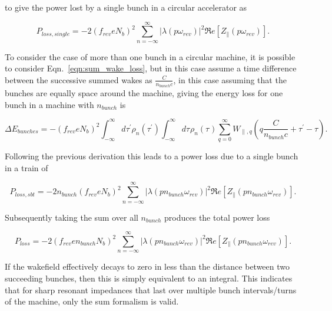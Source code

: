 \documentclass{cernrep}
\begin{document}
to give the power lost by a single bunch in a circular accelerator as 

\begin{equation}
P_{loss, single} = - 2 \left( f_{rev} e N_{b}\right)^{2} \displaystyle\sum\limits_{n = -\infty}^{\infty}  \left| \lambda \left( p \omega_{rev} \right)  \right|^{2} \Re{}e \left[ Z_{\parallel} \left( p \omega_{rev} \right) \right].
\label{eqn:power_loss_single_bunch}
\end{equation}

To consider the case of more than one bunch in a circular machine, it is possible to consider Eqn.~\ref{eqn:sum_wake_loss}, but in this case assume a time difference between the successive summed wakes as $\frac{C}{n_{bunch}c}$, in this case assuming that the bunches are equally space around the machine, giving the energy loss for one bunch in a machine with $n_{bunch}$ is 

\begin{equation}
\Delta E_{bunches} = - \left( f_{rev} e  N_{b}\right)^{2} \int^{\infty}_{-\infty} d\tau^{'} \rho_{n} \left( \tau^{'} \right) \int^{\infty}_{-\infty} d\tau^{} \rho_{n} \left( \tau^{} \right) \displaystyle\sum\limits_{q = 0}^{\infty} W_{\parallel, q} \left( q\frac{C}{n_{bunch}c} + \tau^{'} - \tau \right).  
\label{eqn:sum_wake_loss_bunches}
\end{equation}

Following the previous derivation this leads to a power loss due to a single bunch in a train of 

\begin{equation}
P_{loss, sbt} = - 2 n_{bunch} \left( f_{rev} e  N_{b} \right) ^{2} \displaystyle\sum\limits_{n = -\infty}^{\infty}  \left| \lambda \left( p n_{bunch} \omega_{rev} \right)  \right|^{2} \Re{}e \left[ Z_{\parallel} \left( p n_{bunch}\omega_{rev} \right) \right].
\label{eqn:power_loss_train_single_bunch}
\end{equation}

Subsequently taking the sum over all $n_{bunch}$ produces the total power loss 

\begin{equation}
P_{loss} = - 2 \left( f_{rev} e n_{bunch}  N_{b}\right)^{2} \displaystyle\sum\limits_{n = -\infty}^{\infty}  \left| \lambda \left( p n_{bunch} \omega_{rev} \right)  \right|^{2} \Re{}e \left[ Z_{\parallel} \left( p n_{bunch}\omega_{rev} \right) \right].
\label{eqn:heating-gen}
\end{equation}

If the wakefield effectively decays to zero in less than the distance between two succeeding bunches, then this is simply equivalent to an integral. This indicates that for sharp resonant impedances that last over multiple bunch intervals/turns of the machine, only the sum formalism is valid.
\end{document}
